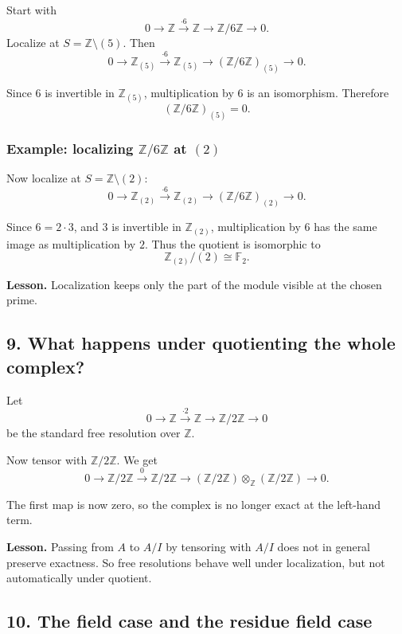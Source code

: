 \documentclass[12pt,a4paper]{article}
\theoremstyle{notespace}
\theoremstyle{definition}
\begin{document}
Start with
\[
0 \longrightarrow \mathbb Z \xrightarrow{\cdot 6} \mathbb Z \longrightarrow \mathbb Z/6\mathbb Z \longrightarrow 0.
\]
Localize at \(S=\mathbb Z\setminus (5)\). Then
\[
0 \longrightarrow \mathbb Z_{(5)} \xrightarrow{\cdot 6} \mathbb Z_{(5)}
\longrightarrow (\mathbb Z/6\mathbb Z)_{(5)} \longrightarrow 0.
\]

Since \(6\) is invertible in \(\mathbb Z_{(5)}\), multiplication by \(6\) is an isomorphism. Therefore
\[
(\mathbb Z/6\mathbb Z)_{(5)}=0.
\]

\subsubsection*{Example: localizing \(\mathbb Z/6\mathbb Z\) at \((2)\)}

Now localize at \(S=\mathbb Z\setminus (2)\):
\[
0 \longrightarrow \mathbb Z_{(2)} \xrightarrow{\cdot 6} \mathbb Z_{(2)}
\longrightarrow (\mathbb Z/6\mathbb Z)_{(2)} \longrightarrow 0.
\]

Since \(6=2\cdot 3\), and \(3\) is invertible in \(\mathbb Z_{(2)}\), multiplication by \(6\) has the same image as multiplication by \(2\). Thus the quotient is isomorphic to
\[
\mathbb Z_{(2)}/(2)\cong \mathbb F_2.
\]

\textbf{Lesson.}
Localization keeps only the part of the module visible at the chosen prime.

\subsection{9. What happens under quotienting the whole complex?}

Let
\[
0 \longrightarrow \mathbb Z \xrightarrow{\cdot 2} \mathbb Z \longrightarrow \mathbb Z/2\mathbb Z \longrightarrow 0
\]
be the standard free resolution over \(\mathbb Z\).

Now tensor with \(\mathbb Z/2\mathbb Z\). We get
\[
0 \longrightarrow \mathbb Z/2\mathbb Z \xrightarrow{0} \mathbb Z/2\mathbb Z
\longrightarrow (\mathbb Z/2\mathbb Z)\otimes_{\mathbb Z}(\mathbb Z/2\mathbb Z) \longrightarrow 0.
\]

The first map is now zero, so the complex is no longer exact at the left-hand term.

\textbf{Lesson.}
Passing from \(A\) to \(A/I\) by tensoring with \(A/I\) does not in general preserve exactness.
So free resolutions behave well under localization, but not automatically under quotient.

\subsection{10. The field case and the residue field case}
\end{document}
